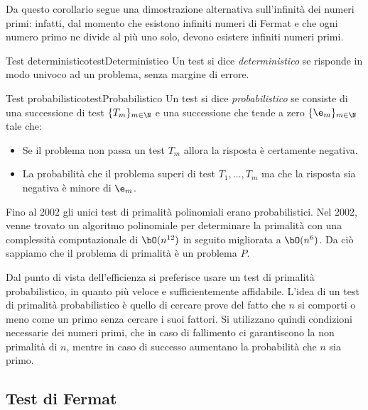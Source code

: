 	\begin{oss}
	Da questo corollario segue una dimostrazione alternativa sull'infinità dei numeri primi: infatti, dal momento che esistono infiniti numeri di Fermat e che ogni numero primo ne divide al più uno solo, devono esistere infiniti numeri primi.
	\end{oss}

	\begin{defn}{Test deterministico}{testDeterministico}
	Un test si dice \emph{deterministico} se risponde in modo univoco ad un problema, senza margine di errore.
	\end{defn}

	\begin{defn}{Test probabilistico}{testProbabilistico}
	Un test si dice \emph{probabilistico} se consiste di una successione di test \(\{T_m\}_{m\in\N}\) e una successione che tende a zero \(\{\e_m\}_{m\in\N}\) tale che:
	\begin{itemize}
		\item Se il problema non passa un test \(T_m\) allora la risposta è certamente negativa.
		\item La probabilità che il problema superi di test \(T_1, \ldots, T_m\) ma che la risposta sia negativa è minore di \(\e_m\).
	\end{itemize}
	\end{defn}

	\begin{oss}
	Fino al 2002 gli unici test di primalità polinomiali erano probabilistici.
	Nel 2002, venne trovato un algoritmo polinomiale per determinare la primalità con una complessità computazionale di \(\bO(n^{12})\) in seguito migliorata a \(\bO(n^6)\).
	Da ciò sappiamo che il problema di primalità è un problema \(P\).
	\end{oss}

	Dal punto di vista dell'efficienza si preferisce usare un test di primalità probabilistico, in quanto più veloce e sufficientemente affidabile.
	L'idea di un test di primalità probabilistico è quello di cercare prove del fatto che \(n\) si comporti o meno come un primo senza cercare i suoi fattori.
	Si utilizzano quindi condizioni necessarie dei numeri primi, che in caso di fallimento ci garantiscono la non primalità di \(n\), mentre in caso di successo aumentano la probabilità che \(n\) sia primo.

\subsection{Test di Fermat}

